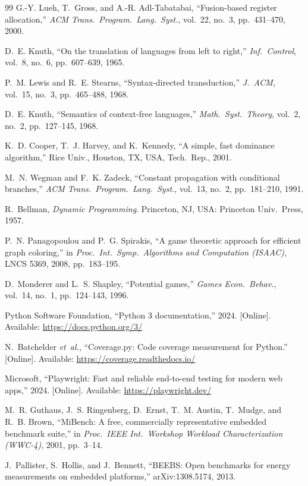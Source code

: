 \documentclass{ieeeaccess}
\begin{document}
\begin{thebibliography}{99}
G.-Y. Lueh, T.~Gross, and A.-R. Adl-Tabatabai, ``Fusion-based register
allocation,'' \emph{ACM Trans.\ Program.\ Lang.\ Syst.}, vol.~22,
no.~3, pp.~431--470, 2000.

D.~E. Knuth, ``On the translation of languages from left to right,''
\emph{Inf.\ Control}, vol.~8, no.~6, pp.~607--639, 1965.

P.~M. Lewis and R.~E. Stearns, ``Syntax-directed transduction,''
\emph{J.~ACM}, vol.~15, no.~3, pp.~465--488, 1968.

D.~E. Knuth, ``Semantics of context-free languages,'' \emph{Math.\
Syst.\ Theory}, vol.~2, no.~2, pp.~127--145, 1968.

K.~D. Cooper, T.~J. Harvey, and K.~Kennedy, ``A simple, fast dominance
algorithm,'' Rice Univ., Houston, TX, USA, Tech.\ Rep., 2001.

M.~N. Wegman and F.~K. Zadeck, ``Constant propagation with conditional
branches,'' \emph{ACM Trans.\ Program.\ Lang.\ Syst.}, vol.~13, no.~2,
pp.~181--210, 1991.

R.~Bellman, \emph{Dynamic Programming}. Princeton, NJ, USA: Princeton
Univ.\ Press, 1957.

P.~N. Panagopoulou and P.~G. Spirakis, ``A game theoretic approach for
efficient graph coloring,'' in \emph{Proc.\ Int.\ Symp.\ Algorithms and
Computation (ISAAC)}, LNCS 5369, 2008, pp.~183--195.

D.~Monderer and L.~S. Shapley, ``Potential games,'' \emph{Games Econ.\
Behav.}, vol.~14, no.~1, pp.~124--143, 1996.

Python Software Foundation, ``Python 3 documentation,'' 2024.
[Online]. Available: \url{https://docs.python.org/3/}

N.~Batchelder \emph{et~al.}, ``Coverage.py: Code coverage measurement
for Python.'' [Online]. Available: \url{https://coverage.readthedocs.io/}

\bibitem{playwright}
Microsoft, ``Playwright: Fast and reliable end-to-end testing for
modern web apps,'' 2024. [Online]. Available:
\url{https://playwright.dev/}

M.~R. Guthaus, J.~S. Ringenberg, D.~Ernst, T.~M. Austin, T.~Mudge, and
R.~B. Brown, ``MiBench: A free, commercially representative embedded
benchmark suite,'' in \emph{Proc.\ IEEE Int.\ Workshop Workload
Characterization (WWC-4)}, 2001, pp.~3--14.

J.~Pallister, S.~Hollis, and J.~Bennett, ``BEEBS: Open benchmarks for
energy measurements on embedded platforms,'' arXiv:1308.5174, 2013.

\end{thebibliography}
\end{document}
